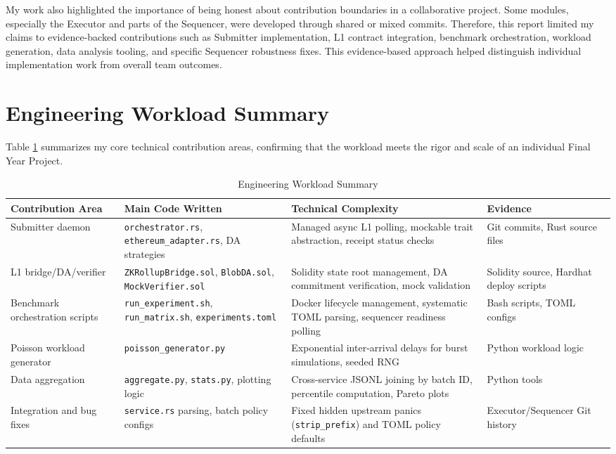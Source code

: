My work also highlighted the importance of being honest about contribution boundaries in a collaborative project. Some modules, especially the Executor and parts of the Sequencer, were developed through shared or mixed commits. Therefore, this report limited my claims to evidence-backed contributions such as Submitter implementation, L1 contract integration, benchmark orchestration, workload generation, data analysis tooling, and specific Sequencer robustness fixes. This evidence-based approach helped distinguish individual implementation work from overall team outcomes.

\section{Engineering Workload Summary}

Table \ref{tab:engineering_workload} summarizes my core technical contribution areas, confirming that the workload meets the rigor and scale of an individual Final Year Project.

\begin{table}[!htbp]
\centering
\caption{Engineering Workload Summary}
\label{tab:engineering_workload}

\begin{tabularx}{\textwidth}{|p{}|X|X|p{}|}
\hline
\textbf{Contribution Area} & \textbf{Main Code Written} & \textbf{Technical Complexity} & \textbf{Evidence} \\ \hline
Submitter daemon & \texttt{orchestrator.rs}, \texttt{ethereum\_adapter.rs}, DA strategies & Managed async L1 polling, mockable trait abstraction, receipt status checks & Git commits, Rust source files \\ \hline
L1 bridge/DA/verifier & \texttt{ZKRollupBridge.sol}, \texttt{BlobDA.sol}, \texttt{MockVerifier.sol} & Solidity state root management, DA commitment verification, mock validation & Solidity source, Hardhat deploy scripts \\ \hline
Benchmark orchestration scripts & \texttt{run\_experiment.sh}, \texttt{run\_matrix.sh}, \texttt{experiments.toml} & Docker lifecycle management, systematic TOML parsing, sequencer readiness polling & Bash scripts, TOML configs \\ \hline
Poisson workload generator & \texttt{poisson\_generator.py} & Exponential inter-arrival delays for burst simulations, seeded RNG & Python workload logic \\ \hline
Data aggregation & \texttt{aggregate.py}, \texttt{stats.py}, plotting logic & Cross-service JSONL joining by batch ID, percentile computation, Pareto plots & Python tools \\ \hline
Integration and bug fixes & \texttt{service.rs} parsing, batch policy configs & Fixed hidden upstream panics (\texttt{strip\_prefix}) and TOML policy defaults & Executor/Sequencer Git history \\ \hline
\end{tabularx}

\end{table}


